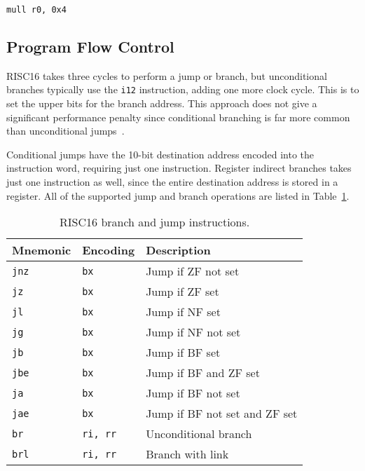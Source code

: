 \begin{center}
\begin{minipage}{0.5\linewidth}
\texttt{mull r0, 0x4}
\end{minipage}
\end{center}


\subsection{Program Flow Control}
\label{RISCPROG_Flow_Control}

RISC16 takes three cycles to perform a jump or branch, but unconditional branches
typically use the \texttt{i12} instruction, adding one more clock cycle. This is
to set the upper bits for the branch address. This approach does not give a
significant performance penalty since conditional branching is far more common
than unconditional jumps~\cite{mcfarland2003md}.

Conditional jumps have the 10-bit destination address encoded into the
instruction word, requiring just one instruction. Register indirect branches
takes just one instruction as well, since the entire destination address is
stored in a register. All of the supported jump and branch operations are listed
in Table~\ref{RISCPROG_Jumps}.

\begin{table}[h!]
\begin{center}
\begin{tabular}{l l l}
\multicolumn{1}{c}{Mnemonic} & Encoding & Description \\
	\hline
	\tt jnz	&	\tt bx	& Jump if ZF not set	\\
	\tt jz	&	\tt bx	& Jump if ZF set	\\
	\tt jl	&	\tt bx	& Jump if NF set	\\
	\tt jg	&	\tt bx	& Jump if NF not set	\\
	\tt jb	&	\tt bx	& Jump if BF set	\\
	\tt jbe	&	\tt bx	& Jump if BF and ZF set	\\
	\tt ja	&	\tt bx	& Jump if BF not set	\\
	\tt jae	&	\tt bx	& Jump if BF not set and ZF set	\\
	\tt br	&	\tt ri, rr	& Unconditional branch	\\
	\tt brl	&	\tt ri, rr	& Branch with link	\\
\end{tabular}
\end{center}
\caption[RISC16 branch and jump instructions]{RISC16 branch and jump
instructions.}
\label{RISCPROG_Jumps}
\end{table}


